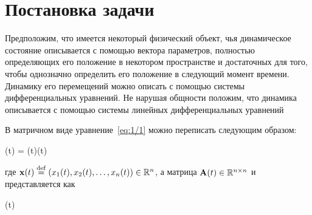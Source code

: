


\chapter{Постановка задачи}
\newcommand{\funcF}{ \calf{F}         } %
\newcommand{\optF}{  \optimum{\funcF} } %



Предположим, что имеется некоторый физический объект, чья динамическое состояние описывается с помощью вектора параметров, полностью определяющих его положение в некотором пространстве и достаточных для того, чтобы однозначно определить его положение в следующий момент времени. Динамику его перемещений можно описать с помощью системы дифференциальных уравнений. Не нарушая общности положим, что динамика описывается с помощью системы линейных дифференциальных уравнений

\eeq

В матричном виде уравнение~\ref{eq:1/1} можно переписать следующим образом:

	(t) = (t)(t) \text{,}
\eeq

где $\mathbf{x}(t) \stackrel{ \mathrm{def} }{=} (x_1(t), x_2(t), \ldots, x_n(t)) \in \mathbb{R}^{n}$, а матрица $\mathbf{A}(t) \in \mathbb{R}^{{n} \times {n}}$ и представляется как

\beqn
	(t) \eqdef {} 
\eeqn

